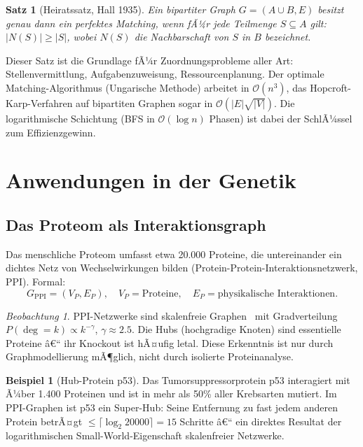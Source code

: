 ﻿\documentclass[12pt,a4paper,twoside]{article}
\theoremstyle{definition}
\newtheorem{beispiel}{Beispiel}[section]
\theoremstyle{plain}
\newtheorem{theorem}{Satz}[section]
\theoremstyle{remark}
\newtheorem{beobachtung}{Beobachtung}[section]
\begin{document}
\begin{theorem}[Heiratssatz, Hall 1935]
Ein bipartiter Graph $G = (A \cup B, E)$ besitzt genau dann
ein perfektes Matching, wenn fÃ¼r jede Teilmenge $S \subseteq A$
gilt: $|N(S)| \geq |S|$, wobei $N(S)$ die Nachbarschaft
von $S$ in $B$ bezeichnet.
\end{theorem}

Dieser Satz ist die Grundlage fÃ¼r Zuordnungsprobleme aller Art:
Stellenvermittlung, Aufgabenzuweisung, Ressourcenplanung.  Der
optimale Matching-Algorithmus (Ungarische Methode) arbeitet in
$\mathcal{O}(n^3)$, das Hopcroft-Karp-Verfahren auf bipartiten
Graphen sogar in $\mathcal{O}(|E| \sqrt{|V|})$.  Die logarithmische
Schichtung (BFS in $\mathcal{O}(\log n)$ Phasen) ist dabei der
SchlÃ¼ssel zum Effizienzgewinn.

\section{Anwendungen in der Genetik}
\label{sec:genetik}

\subsection{Das Proteom als Interaktionsgraph}

Das menschliche Proteom umfasst etwa 20.000 Proteine, die
untereinander ein dichtes Netz von Wechselwirkungen bilden
(Protein-Protein-Interaktionsnetzwerk, PPI).  Formal:
\[
  G_{\text{PPI}} = (V_P, E_P), \quad
  V_P = \text{Proteine}, \quad
  E_P = \text{physikalische Interaktionen}.
\]

\begin{beobachtung}
PPI-Netzwerke sind skalenfreie Graphen~\cite{Barabasi1999} mit
Gradverteilung $P(\deg = k) \propto k^{-\gamma}$, $\gamma \approx 2.5$.
Die Hubs (hochgradige Knoten) sind essentielle Proteine â€“ ihr
Knockout ist hÃ¤ufig letal.  Diese Erkenntnis ist nur durch
Graphmodellierung mÃ¶glich, nicht durch isolierte Proteinanalyse.
\end{beobachtung}

\begin{beispiel}[Hub-Protein p53]
Das Tumorsuppressorprotein p53 interagiert mit Ã¼ber 1.400
Proteinen und ist in mehr als 50\% aller Krebsarten mutiert.
Im PPI-Graphen ist p53 ein Super-Hub: Seine Entfernung zu
fast jedem anderen Protein betrÃ¤gt $\leq \lceil\log_2 20000\rceil = 15$
Schritte â€“ ein direktes Resultat der logarithmischen
Small-World-Eigenschaft skalenfreier Netzwerke.
\end{beispiel}
\end{document}
